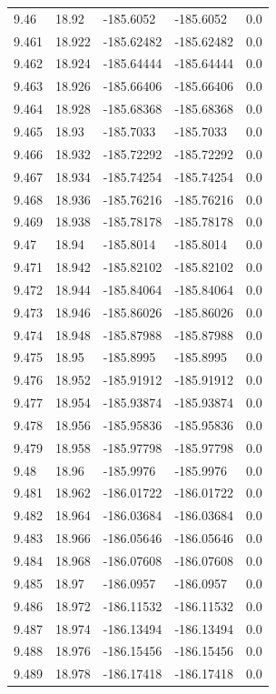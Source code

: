 \begin{tabular}{lllll}
9.46 & 18.92 & -185.6052 & -185.6052 & 0.0 \\
9.461 & 18.922 & -185.62482 & -185.62482 & 0.0 \\
9.462 & 18.924 & -185.64444 & -185.64444 & 0.0 \\
9.463 & 18.926 & -185.66406 & -185.66406 & 0.0 \\
9.464 & 18.928 & -185.68368 & -185.68368 & 0.0 \\
9.465 & 18.93 & -185.7033 & -185.7033 & 0.0 \\
9.466 & 18.932 & -185.72292 & -185.72292 & 0.0 \\
9.467 & 18.934 & -185.74254 & -185.74254 & 0.0 \\
9.468 & 18.936 & -185.76216 & -185.76216 & 0.0 \\
9.469 & 18.938 & -185.78178 & -185.78178 & 0.0 \\
9.47 & 18.94 & -185.8014 & -185.8014 & 0.0 \\
9.471 & 18.942 & -185.82102 & -185.82102 & 0.0 \\
9.472 & 18.944 & -185.84064 & -185.84064 & 0.0 \\
9.473 & 18.946 & -185.86026 & -185.86026 & 0.0 \\
9.474 & 18.948 & -185.87988 & -185.87988 & 0.0 \\
9.475 & 18.95 & -185.8995 & -185.8995 & 0.0 \\
9.476 & 18.952 & -185.91912 & -185.91912 & 0.0 \\
9.477 & 18.954 & -185.93874 & -185.93874 & 0.0 \\
9.478 & 18.956 & -185.95836 & -185.95836 & 0.0 \\
9.479 & 18.958 & -185.97798 & -185.97798 & 0.0 \\
9.48 & 18.96 & -185.9976 & -185.9976 & 0.0 \\
9.481 & 18.962 & -186.01722 & -186.01722 & 0.0 \\
9.482 & 18.964 & -186.03684 & -186.03684 & 0.0 \\
9.483 & 18.966 & -186.05646 & -186.05646 & 0.0 \\
9.484 & 18.968 & -186.07608 & -186.07608 & 0.0 \\
9.485 & 18.97 & -186.0957 & -186.0957 & 0.0 \\
9.486 & 18.972 & -186.11532 & -186.11532 & 0.0 \\
9.487 & 18.974 & -186.13494 & -186.13494 & 0.0 \\
9.488 & 18.976 & -186.15456 & -186.15456 & 0.0 \\
9.489 & 18.978 & -186.17418 & -186.17418 & 0.0 \\

\end{tabular}

